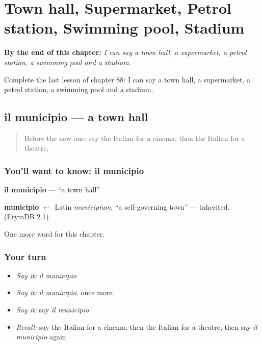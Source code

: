 
\chapter{Town hall, Supermarket, Petrol station, Swimming pool, Stadium}
\label{ch:it-town-hall-supermarket-petrol-station-swimming-pool-stadium}

\begin{chapteropening}
\textbf{By the end of this chapter:} \emph{I can say a town hall, a supermarket, a petrol station, a swimming pool and a stadium.}

Complete the last lesson of chapter 88: I can say a town hall, a supermarket, a petrol station, a swimming pool and a stadium.
\end{chapteropening}

\section[il municipio]{il municipio — a town hall}

\label{lesson:IT-C88-municipio}



\begin{quote}
Before the new one: say the Italian for a cinema, then the Italian for a theatre.
\end{quote}

\subsection*{You'll want to know: il municipio}
\textbf{il municipio} — \textquotedblleft{}a town hall\textquotedblright{}.

\begin{cousinweb}
\textbf{municipio} $\leftarrow$ Latin \emph{municipium}, \textquotedblleft{}a self-governing town\textquotedblright{} — inherited. (EtymDB 2.1)
\end{cousinweb}

\begin{grammarlens}[title={What you've built}]
One more word for this chapter.
\end{grammarlens}

\subsection*{Your turn}
\begin{itemize}
\raggedright
  \item \emph{Say it:} \emph{il municipio}
  \item \emph{Say it:} \emph{il municipio}, once more
  \item \emph{Say it:} say \emph{il municipio}
  \item \emph{Recall:} say the Italian for a cinema, then the Italian for a theatre, then say \emph{il municipio} again
\end{itemize}

